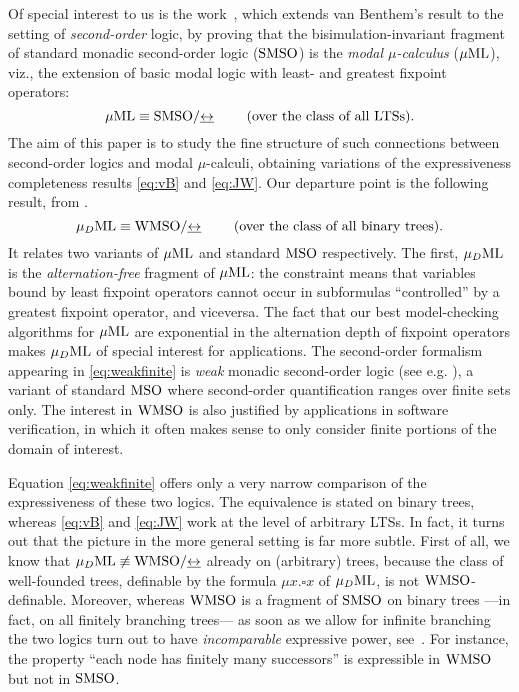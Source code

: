 Of special interest to us is the work~\cite{Jan96}, which extends van Benthem's
result to the setting of \emph{second-order} logic, by proving that the 
bisimulation-invariant fragment of standard monadic second-order logic 
($\mathrm{SMSO}$) is the \emph{modal $\mu$-calculus} ($\mu\mathrm{ML}$), viz., the extension of
basic modal logic with least- and greatest fixpoint operators:
\begin{equation}
\label{eq:JW}
\muML \equiv \smso/{\bis}  \qquad  \text{ (over the class of all LTSs)}.
\end{equation}
The aim of this paper is to study the fine structure of such connections between
second-order logics and modal $\mu$-calculi, obtaining variations of the
expressiveness completeness results \eqref{eq:vB} and \eqref{eq:JW}.
Our departure point is the following result, from \cite{ArnNiw92}.
\begin{equation}
\label{eq:weakfinite}
\AFMC \equiv \wmso/{\bis}  \qquad  \text{ (over the class of all binary trees)}.
\end{equation}
It relates two variants of $\mu\mathrm{ML}$ and standard $\mathrm{MSO}$ respectively. 
The first, $\mu_{D}\mathrm{ML}$ is the \emph{alternation-free} fragment of $\mu\mathrm{ML}$: the
constraint means that variables bound by least fixpoint operators cannot occur
in subformulas ``controlled'' by a greatest fixpoint operator, and viceversa. 
The fact that our best model-checking algorithms for $\mu\mathrm{ML}$ are exponential in
the alternation depth of fixpoint operators 
\cite{EmersonL86,DBLP:conf/cav/LongBCJM94} makes $\mu_{D}\mathrm{ML}$ of special interest for
applications. 
The second-order formalism appearing in \eqref{eq:weakfinite} is \emph{weak}
monadic second-order logic (see e.g. \cite[Ch. 3]{ALG02}), a variant of standard
$\mathrm{MSO}$ where second-order quantification ranges over finite sets only. 
The interest in $\mathrm{WMSO}$ is also justified by applications in software 
verification, in which it often makes sense to only consider finite portions of 
the domain of interest. 
\medskip

Equation \eqref{eq:weakfinite} offers only a very narrow comparison of the
expressiveness of these two logics. 
The equivalence is stated on binary trees, whereas \eqref{eq:vB} and
\eqref{eq:JW} work at the level of arbitrary LTSs. 
In fact, it turns out that the picture in the more general setting is far more
subtle. 
First of all, we know that $\mu_{D}\mathrm{ML} \not\equiv \mathrm{WMSO}/{\mathrel{\underline{\leftrightarrow}}}$ already on (arbitrary) trees, because the class of well-founded trees, definable by the formula $\mu x.\square x$ of $\mu_{D}\mathrm{ML}$, is not $\mathrm{WMSO}$-definable. 
Moreover, whereas $\mathrm{WMSO}$ is a fragment of $\mathrm{SMSO}$ on binary trees ---in fact, 
on all finitely branching trees--- as soon as we allow for infinite branching 
the two logics turn out to have \emph{incomparable} expressive power, 
see~\cite{CateF11,Zanasi:Thesis:2012}. 
For instance, the property ``each node has finitely many successors'' is 
expressible in $\mathrm{WMSO}$ but not in $\mathrm{SMSO}$.

